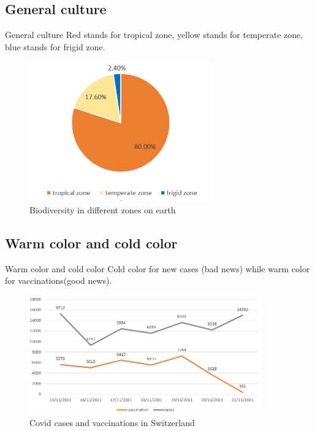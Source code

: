 \documentclass[11pt]{beamer}
\begin{document}
\subsection{General culture}
\begin{frame}{General culture}
Red stands for tropical zone, yellow stands for temperate zone, blue stands for frigid zone.
    \begin{figure}[htbp]
        \centering
        \includegraphics[width = 8cm]{capture.PNG}
        \caption{Biodiversity in different zones on earth}
        \label{fig:my_label}
    \end{figure}  
\end{frame}

\subsection{Warm color and cold color}
\begin{frame}{Warm color and cold color}
Cold color for new cases (bad news) while warm color for vaccinations(good news).
    \begin{figure}
        \centering
        \includegraphics[width = 10cm]{cases.PNG}
        \caption{Covid cases and vaccinations in Switzerland}
        \label{fig:my_label}
    \end{figure}
\end{frame}
\end{document}

